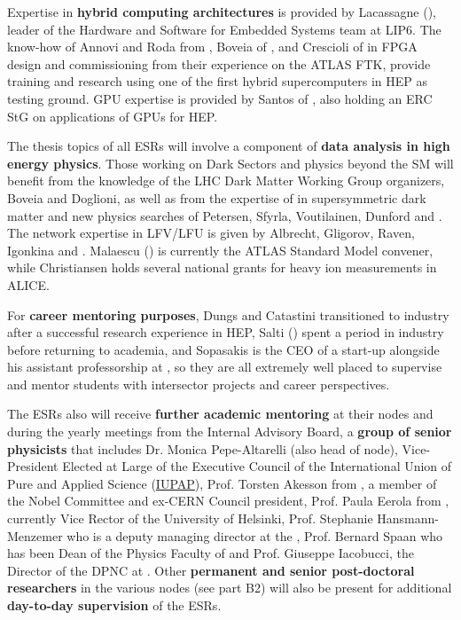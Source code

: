 Expertise in \textbf{hybrid computing architectures} is provided by Lacassagne (\sorbonneentity), leader of the Hardware and Software for Embedded Systems team at LIP6. 
The know-how of Annovi and Roda from \pisaentity, Boveia of \ohioentity, and Crescioli of \cnrsentity in FPGA design and commissioning from their experience on the ATLAS FTK, provide training and research using one of the first hybrid supercomputers in HEP as testing ground. 
GPU expertise is provided by Santos of \santiagoentity, also holding an ERC StG on applications of GPUs for HEP. 

The thesis topics of all ESRs will involve a component of \textbf{data analysis in high energy physics}. 
Those working on Dark Sectors and physics beyond the SM will benefit from the knowledge of the LHC Dark Matter Working Group organizers, 
Boveia and Doglioni, as well as from the expertise of in supersymmetric dark matter and new physics searches of Petersen, Sfyrla, 
Voutilainen, Dunford and . 
The network expertise in LFV/LFU is given by Albrecht, Gligorov, Raven, Igonkina and . 
Malaescu (\cnrsentity) is currently the ATLAS Standard Model convener, while Christiansen holds several national grants for heavy ion measurements in ALICE. 

For \textbf{career mentoring purposes}, Dungs and Catastini transitioned to industry after a successful research experience in HEP, Salti (\uniboentity) spent a period in industry before returning to academia, and Sopasakis is the CEO of a start-up alongside his assistant professorship at \lundentity, so they are all extremely well placed to supervise and mentor students with intersector projects and career perspectives. 

The ESRs also will receive \textbf{further academic mentoring} at their nodes and during the yearly meetings from the Internal Advisory Board, a \textbf{group of senior physicists} that includes Dr. Monica Pepe-Altarelli (also head of \cern node), Vice-President Elected at Large of the Executive Council of the International Union of Pure and Applied Science  (\href{http://iupap.org/}{IUPAP}), Prof. Torsten Akesson from \lundentity, a member of the Nobel Committee and ex-CERN Council president, Prof. Paula Eerola from \helsinkientity, currently Vice Rector of the University of Helsinki, Prof. Stephanie Hansmann- Menzemer who is a deputy managing director at the \heidelbergentity, Prof. Bernard Spaan who has been Dean of the Physics Faculty of \dortmund and Prof. Giuseppe Iacobucci, the Director of the DPNC at \unigeentity. 
Other \textbf{permanent and senior post-doctoral researchers} in the various nodes (see part B2) will also be present for additional \textbf{day-to-day supervision} of the ESRs. 


